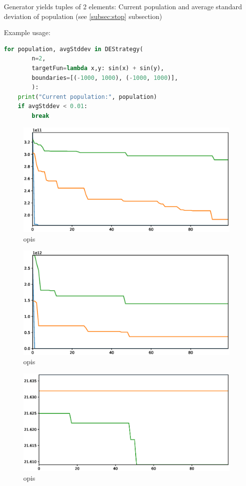 \documentclass[11pt,a4paper]{article}
\begin{document}
Generator yields tuples of 2 elements:
Current population and average standard deviation of population (see \ref{subsec:stop} subsection)

Example usage:
\begin{lstlisting}[language=Python]
for population, avgStddev in DEStrategy(
        n=2,
        targetFun=lambda x,y: sin(x) + sin(y),
        boundaries=[(-1000, 1000), (-1000, 1000)],
        ):
    print("Current population:", population)
    if avgStddev < 0.01:
        break
\end{lstlisting}

\begin{figure}[H]
	\centering
	\includegraphics[scale=0.6]{cec2013_1.eps}
	\caption{opis}
\end{figure}

\begin{figure}[H]
	\centering
	\includegraphics[scale=0.6]{cec2013_2.eps}
	\caption{opis}
\end{figure}

\begin{figure}[H]
	\centering
	\includegraphics[scale=0.6]{cec2013_3.eps}
	\caption{opis}
\end{figure}
\end{document}

